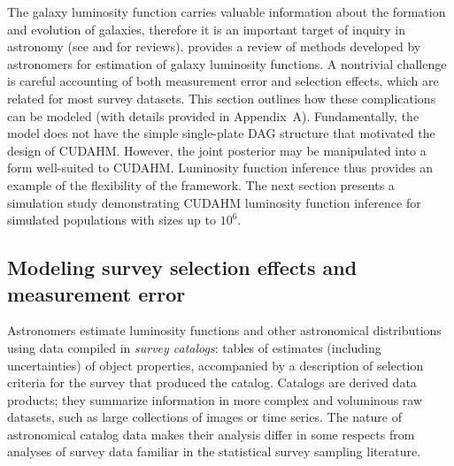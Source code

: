 
The galaxy luminosity function carries valuable information about the formation and evolution of galaxies, therefore it is an important target of inquiry in astronomy (see \citealt{BST88-LumFuncReview} and \citealt{J11-LumFuncReview} for reviews).
\cite{J11-LumFuncReview} provides a review of methods developed by astronomers for estimation of galaxy luminosity functions.
A nontrivial challenge is careful accounting of both measurement error and selection effects, which are related for most survey datasets.
This section outlines how these complications can be modeled (with details provided in Appendix~A).
Fundamentally, the model does not have the simple single-plate DAG structure that motivated the design of CUDAHM.
However, the joint posterior may be manipulated into a form well-suited to CUDAHM.
Luminosity function inference thus provides an example of the flexibility of the framework.
The next section presents a simulation study demonstrating CUDAHM luminosity function inference for simulated populations with sizes up to $10^6$.



\subsection{Modeling survey selection effects and measurement error}
\label{sec:slxn+err}

Astronomers estimate luminosity functions and other astronomical distributions using data compiled in \emph{survey catalogs}: tables of estimates (including uncertainties) of object properties, accompanied by a description of selection criteria for the survey that produced the catalog.
Catalogs are derived data products; they summarize information in more complex and voluminous raw datasets, such as large collections of images or time series.
The nature of astronomical catalog data makes their analysis differ in some respects from analyses of survey data familiar in the statistical survey sampling literature.

